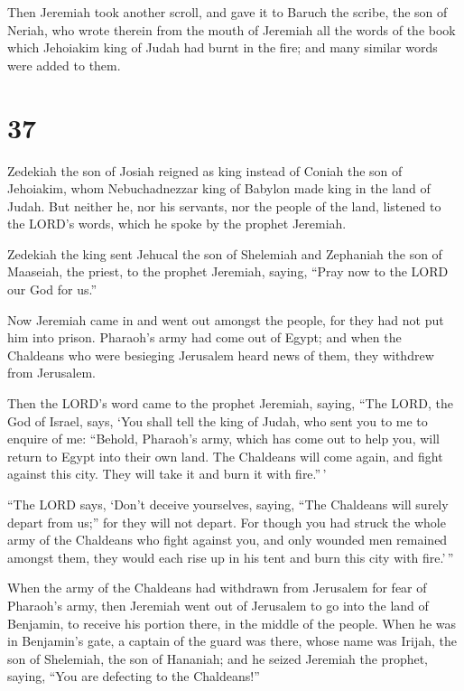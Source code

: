  Then Jeremiah took another scroll, and gave it to Baruch
the scribe, the son of Neriah, who wrote therein from the mouth of
Jeremiah all the words of the book which Jehoiakim king of Judah had
burnt in the fire; and many similar words were added to them.

\hypertarget{section-36}{%
\section{37}\label{section-36}}

 Zedekiah the son of Josiah reigned as king instead of
Coniah the son of Jehoiakim, whom Nebuchadnezzar king of Babylon made
king in the land of Judah.  But neither he, nor his
servants, nor the people of the land, listened to the LORD's words,
which he spoke by the prophet Jeremiah.

 Zedekiah the king sent Jehucal the son of Shelemiah and
Zephaniah the son of Maaseiah, the priest, to the prophet Jeremiah,
saying, ``Pray now to the LORD our God for us.''

 Now Jeremiah came in and went out amongst the people, for
they had not put him into prison.  Pharaoh's army had come
out of Egypt; and when the Chaldeans who were besieging Jerusalem heard
news of them, they withdrew from Jerusalem.

 Then the LORD's word came to the prophet Jeremiah,
saying,  ``The LORD, the God of Israel, says, `You shall
tell the king of Judah, who sent you to me to enquire of me: ``Behold,
Pharaoh's army, which has come out to help you, will return to Egypt
into their own land.  The Chaldeans will come again, and
fight against this city. They will take it and burn it with fire.''\,'

 ``The LORD says, `Don't deceive yourselves, saying, ``The
Chaldeans will surely depart from us;'' for they will not depart.
 For though you had struck the whole army of the
Chaldeans who fight against you, and only wounded men remained amongst
them, they would each rise up in his tent and burn this city with
fire.'\,''

 When the army of the Chaldeans had withdrawn from
Jerusalem for fear of Pharaoh's army,  then Jeremiah went
out of Jerusalem to go into the land of Benjamin, to receive his portion
there, in the middle of the people.  When he was in
Benjamin's gate, a captain of the guard was there, whose name was
Irijah, the son of Shelemiah, the son of Hananiah; and he seized
Jeremiah the prophet, saying, ``You are defecting to the Chaldeans!''


